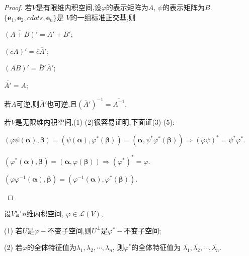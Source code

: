 \begin{proof}
若$V$是有限维内积空间,设$\varphi$的表示矩阵为$A$, $\psi$的表示矩阵为$B$.
$\{\bm{e}_1,\bm{e}_2,cdots,\bm{e}_n\}$是
$V$的一组标准正交基,则
\begin{asparaenum}[(1)]
  \item $\overline{(A+B)}'=\overline{A}'+\overline{B}'$;
  \item $\overline{(cA)}'=\overline{c}\overline{A}'$;
  \item $\overline{(AB)}'=\overline{B}'\overline{A}'$;
  \item $\overline{\overline{A}'}=A$;
  \item 若$A$可逆,则$\overline{A}'$也可逆,且$(\overline{A}')^{-1}=\overline{A^{-1}}$.
\end{asparaenum}

若$V$是无限维内积空间,(1)-(2)很容易证明,下面证(3)-(5):
\begin{asparaenum}[(1)]
  \setcounter{enumi}{2}%
  \item $(\varphi\psi(\bm{\alpha}),\bm{\beta})=
  (\psi(\bm{\alpha}),\varphi^*(\bm{\beta}))=
  (\bm{\alpha},\psi^*\varphi^*(\bm{\beta})) \Longrightarrow
    (\varphi\psi)^*=\psi^*\varphi^*.$
  \item $(\varphi^*(\bm{\alpha}),\bm{\beta})=(\bm{\alpha},\varphi(\bm{\beta}))
    \Longrightarrow (\varphi^*)^*=\varphi.$
  \item $(\varphi\varphi^{-1}(\bm{\alpha}),\bm{\beta})=
    (\varphi^{-1}(\bm{\alpha}),\varphi^*(\bm{\beta})).$
\end{asparaenum}
\end{proof}

\begin{question}
  设$V$是$n$维内积空间, $\varphi\in \mathscr{L}(V)$,

  (1) 若$U$是$\varphi-$不变子空间,则$U^{\perp}$是$\varphi^*-$不变子空间;

  (2) 若$\varphi$的全体特征值为$\lambda_1,\lambda_2,\cdots,\lambda_n$,
  则$\varphi^*$的全体特征值为
  $\overline{\lambda_1},\overline{\lambda_2},\cdots,\overline{\lambda_n}$.
\end{question}

